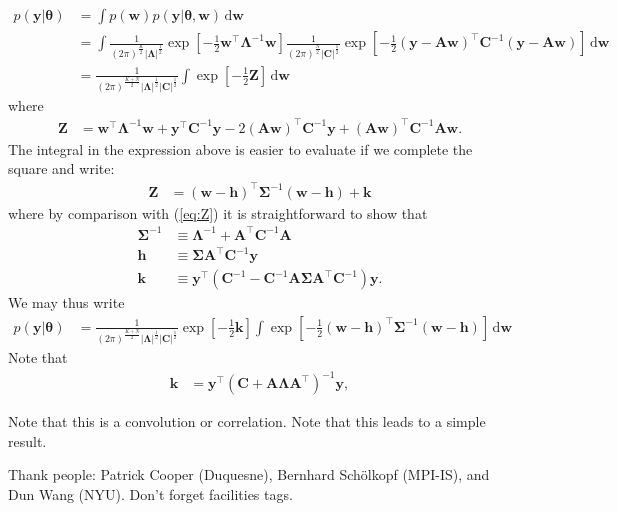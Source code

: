 \documentclass[modern]{rnaastex}
\newcommand{\dd}{\ensuremath{\,\mathrm{d}}}
\newcommand{\bvec}[1]{{\ensuremath{\boldsymbol{#1}}}}
\newcommand{\Gaussian}[3]{\ensuremath{\frac{1}{(2\pi)^\frac{#3}{2}|#2|^\frac{1}{2}}
            \exp\left[ -\frac{1}{2}#1^\top #2^{-1} #1 \right]}}
\begin{document}
\begin{align}
\label{eq:integral}
p(\bvec{y} | \bvec{\theta}) &=
    \int p(\bvec{w}) p(\bvec{y} | \bvec{\theta}, \bvec{w}) \dd\bvec{w}
    \nonumber \\
%
&= \int \Gaussian{\bvec{w}}{\bvec{\Lambda}}{K}
        \Gaussian{(\bvec{y} - \bvec{A}\bvec{w})}{\bvec{C}}{N}
        \dd\bvec{w} \nonumber \\
%
&= \frac{1}{(2\pi)^\frac{K+N}{2}
        |\bvec{\Lambda}|^\frac{1}{2}
        |\bvec{C}|^\frac{1}{2}}
   \int \exp\left[ -\frac{1}{2} \bvec{Z} \right] \dd\bvec{w}
\end{align}
%
where
%
\begin{align}
\label{eq:Z}
\bvec{Z} &= \bvec{w}^\top\bvec{\Lambda}^{-1}\bvec{w} +
            \bvec{y}^\top\bvec{C}^{-1}\bvec{y} -
            2(\bvec{A}\bvec{w})^\top \bvec{C}^{-1} \bvec{y} +
            (\bvec{A}\bvec{w})^\top \bvec{C}^{-1} \bvec{A}\bvec{w}.
\end{align}
%
The integral in the expression above is easier to evaluate if we
complete the square and write:
%
\begin{align}
\label{eq:Z_square}
\bvec{Z} &= (\bvec{w} - \bvec{h})^\top \bvec{\Sigma}^{-1}
            (\bvec{w} - \bvec{h}) + \bvec{k}
\end{align}
%
where by comparison with (\ref{eq:Z}) it is straightforward to show that
%
\begin{align}
\bvec{\Sigma}^{-1} &\equiv \bvec{\Lambda}^{-1} +
                           \bvec{A}^\top \bvec{C}^{-1} \bvec{A} \\
%
\bvec{h} &\equiv \bvec{\Sigma}\bvec{A}^\top \bvec{C}^{-1} \bvec{y} \\
%
\bvec{k} &\equiv \bvec{y}^\top
            \left(
            \bvec{C}^{-1} -
            \bvec{C}^{-1} \bvec{A} \bvec{\Sigma} \bvec{A}^\top \bvec{C}^{-1}
            \right) \bvec{y}.
\end{align}
We may thus write
%
\begin{align}
p(\bvec{y} | \bvec{\theta}) &=
        \frac{1}{(2\pi)^\frac{K+N}{2}
        |\bvec{\Lambda}|^\frac{1}{2}
        |\bvec{C}|^\frac{1}{2}}
    \exp
    \left[
        -\frac{1}{2}
        \bvec{k}
    \right]
   \int \exp
        \left[
            -\frac{1}{2}
            (\bvec{w} - \bvec{h})^\top \bvec{\Sigma}^{-1} (\bvec{w} - \bvec{h})
        \right]
     \dd\bvec{w}
\end{align}
%
%
%
Note that
\begin{align}
\bvec{k} &= \bvec{y}^\top
            \left(
            \bvec{C} + \bvec{A}\bvec{\Lambda}\bvec{A}^\top
            \right)^{-1}
            \bvec{y},
\end{align}

Note that this is a convolution or correlation. Note that this leads to a simple result.

\acknowledgements
Thank people:
  Patrick Cooper (Duquesne),
  Bernhard Sch\"olkopf (MPI-IS), and
  Dun Wang (NYU).
Don't forget facilities tags.


\end{document}
